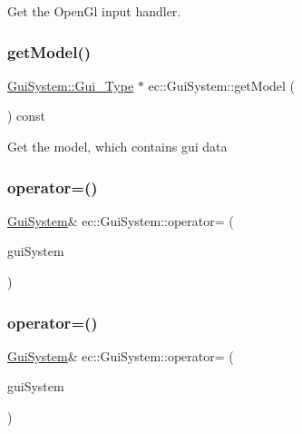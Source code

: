 Get the Open\+Gl input handler. \mbox{\label{classec_1_1_gui_system_ac3fa8830a25f04be9fc3c37860060dc5}} 
\subsubsection{\texorpdfstring{get\+Model()}{getModel()}}
{\footnotesize\ttfamily \mbox{\hyperlink{classec_1_1_gui_system_a7f6534f297da47e8618dd1b9fed934ae}{Gui\+System\+::\+Gui\+\_\+\+Type}} $\ast$ ec\+::\+Gui\+System\+::get\+Model (\begin{DoxyParamCaption}{ }\end{DoxyParamCaption}) const}

Get the model, which contains gui data \mbox{\label{classec_1_1_gui_system_ad5a367d3f8cb0190ccccfacc61ad1c05}} 
\subsubsection{\texorpdfstring{operator=()}{operator=()}\hspace{0.1cm}{\footnotesize\ttfamily [1/2]}}
{\footnotesize\ttfamily \mbox{\hyperlink{classec_1_1_gui_system}{Gui\+System}}\& ec\+::\+Gui\+System\+::operator= (\begin{DoxyParamCaption}\item[{const \mbox{\hyperlink{classec_1_1_gui_system}{Gui\+System}} \&}]{gui\+System }\end{DoxyParamCaption})\hspace{0.3cm}{\ttfamily [delete]}}

\mbox{\label{classec_1_1_gui_system_ac00212035d5b6fbb16f6f4425f0e8926}} 
\subsubsection{\texorpdfstring{operator=()}{operator=()}\hspace{0.1cm}{\footnotesize\ttfamily [2/2]}}
{\footnotesize\ttfamily \mbox{\hyperlink{classec_1_1_gui_system}{Gui\+System}}\& ec\+::\+Gui\+System\+::operator= (\begin{DoxyParamCaption}\item[{\mbox{\hyperlink{classec_1_1_gui_system}{Gui\+System}} \&\&}]{gui\+System }\end{DoxyParamCaption})\hspace{0.3cm}{\ttfamily [default]}}

